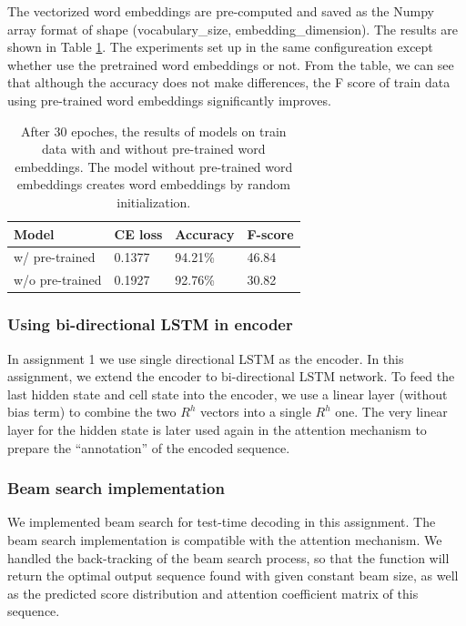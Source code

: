 \documentclass[11pt,a4paper]{article}
\begin{document}
The vectorized word embeddings are pre-computed and saved as the Numpy array format of shape (vocabulary\_size, embedding\_dimension). The results are shown in Table \ref{embed}. The experiments set up in the same configureation except whether use the pretrained word embeddings or not. From the table, we can see that although the accuracy does not make differences, the F score of train data using pre-trained word embeddings significantly improves.

\begin{table}[ht]
\centering
\caption{After 30 epoches, the results of models on train data with and without pre-trained word embeddings. The model without pre-trained word embeddings creates word embeddings by random initialization. }
\label{embed}
\begin{tabular}{@{}llll@{}}
\toprule
Model                     & CE loss  & Accuracy & F-score \\ \midrule
w/ pre-trained          & 0.1377 & 94.21\%  & 46.84   \\
w/o pre-trained & 0.1927 & 92.76\%  & 30.82   \\ \bottomrule
\end{tabular}
\end{table}

\subsubsection{Using bi-directional LSTM in encoder}

	In assignment 1 we use single directional LSTM as the encoder. In this assignment, we extend the encoder to bi-directional LSTM network. To feed the last hidden state and cell state into the encoder, we use a linear layer (without bias term) to combine the two $R^h$ vectors into a single $R^h$ one. The very linear layer for the hidden state is later used again in the attention mechanism to prepare the ``annotation'' of the encoded sequence.

\subsubsection{Beam search implementation}

	We implemented beam search for test-time decoding in this assignment. The beam search implementation is compatible with the attention mechanism. We handled the back-tracking of the beam search process, so that the function will return the optimal output sequence found with given constant beam size, as well as the predicted score distribution and attention coefficient matrix of this sequence.
    
\end{document}
